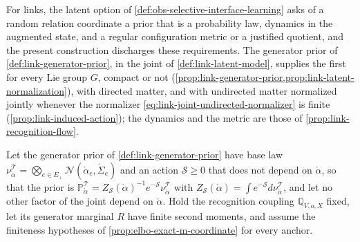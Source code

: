 For links, the latent option of \cref{def:obs-selective-interface-learning} asks of a random relation
coordinate a prior that is a probability law, dynamics in the augmented state, and a regular configuration
metric or a justified quotient, and the present construction discharges these requirements. The generator
prior of \cref{def:link-generator-prior}, in the joint of \cref{def:link-latent-model}, supplies the first for
every Lie group $G$, compact or not (\cref{prop:link-generator-prior,prop:link-latent-normalization}), with
directed matter, and with undirected matter normalized jointly whenever the normalizer
\eqref{eq:link-joint-undirected-normalizer} is finite (\cref{prop:link-induced-action}); the dynamics and the
metric are those of \cref{prop:link-recognition-flow}.

Let the generator prior of \cref{def:link-generator-prior} have base law
$\nu^{\mathscr T}_{\mathring\alpha}=\bigotimes_{e\in E_+}\mathcal N(\mathring\alpha_e,\mathring\Sigma_e)$
and an action $\mathscr S\geq0$ that does not depend on $\mathring\alpha$, so that the prior is
$\mathbb P^{\mathscr T}_{\mathring\alpha}=Z_{\mathscr S}(\mathring\alpha)^{-1}e^{-\mathscr S}\nu^{\mathscr T}_{\mathring\alpha}$
with $Z_{\mathscr S}(\mathring\alpha)=\int e^{-\mathscr S}d\nu^{\mathscr T}_{\mathring\alpha}$, and let
no other factor of the joint depend on $\mathring\alpha$. Hold the recognition coupling
$\mathbb Q_{V,o,X}$ fixed, let its generator marginal $R$ have finite second moments, and assume the
finiteness hypotheses of \cref{prop:elbo-exact-m-coordinate} for every anchor.
